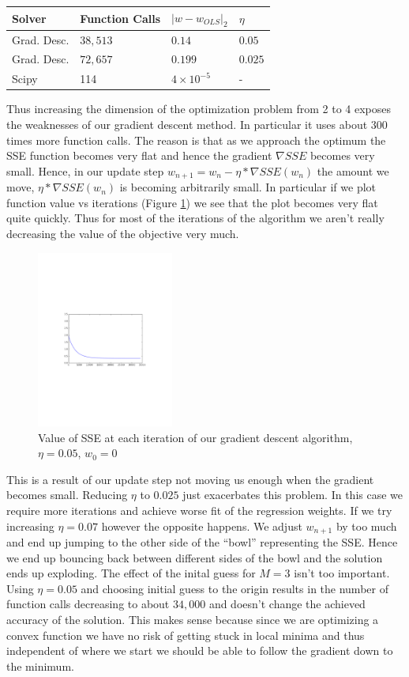 \documentclass{article}
\begin{document}
\begin{tabular}{|l|l|l|l|}
\hline
Solver & Function Calls & $|w - w_{OLS}|_2$ & $\eta$ \\ \hline
Grad. Desc. & $38,513$ & $0.14$ & $0.05$ \\ \hline
Grad. Desc. & $72, 657$ & $0.199$ & $0.025$ \\ \hline
Scipy & 114 & $4\times 10^{-5}$ & - \\ \hline
\end{tabular}
%
%

Thus increasing the dimension of the optimization problem from 2 to 4 exposes the weaknesses of our gradient descent method. In particular it uses about $300$ times more function calls. The reason is that as we approach the optimum the SSE function becomes very flat and hence the gradient $\nabla SSE$ becomes very small. Hence, in our update step $w_{n+1} = w_n - \eta*\nabla SSE(w_n)$ the amount we move, $\eta*\nabla SSE(w_n)$ is becoming arbitrarily small. In particular if we plot function value vs iterations (Figure \ref{grad-descent-iterations}) we see that the plot becomes very flat quite quickly. Thus for most of the iterations of the algorithm we aren't really decreasing the value of the objective very much. 

\begin{figure}[h]
\centering
\includegraphics[width=0.4\textwidth]{lin-reg-fig-1}
\caption{Value of SSE at each iteration of our gradient descent algorithm, $\eta = 0.05$, $w_0 = 0$}
\label{grad-descent-iterations}
\end{figure}

This is a result of our update step not moving us enough when the gradient becomes small. Reducing $\eta$ to $0.025$ just exacerbates this problem. In this case we require more iterations and achieve worse fit of the regression weights. If we try increasing $\eta = 0.07$ however the opposite happens. We adjust $w_{n+1}$ by too much and end up jumping to the other side of the ``bowl'' representing the SSE. Hence we end up bouncing back between different sides of the bowl and the solution ends up exploding. The effect of the inital guess for $M = 3$ isn't too important. Using $\eta = 0.05$ and choosing initial guess to the origin results in the number of function calls decreasing to about $34,000$ and doesn't change the achieved accuracy of the solution. This makes sense because since we are optimizing a convex function we have no risk of getting stuck in local minima and thus independent of where we start we should be able to follow the gradient down to the minimum.
\end{document}
